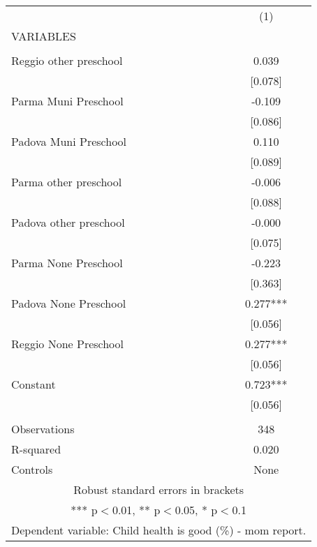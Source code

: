 \begin{tabular}{lc} \hline
 & (1) \\
VARIABLES &  \\ \hline
 &  \\
Reggio other preschool & 0.039 \\
 & [0.078] \\
Parma Muni Preschool & -0.109 \\
 & [0.086] \\
Padova Muni Preschool & 0.110 \\
 & [0.089] \\
Parma other preschool & -0.006 \\
 & [0.088] \\
Padova other preschool & -0.000 \\
 & [0.075] \\
Parma None Preschool & -0.223 \\
 & [0.363] \\
Padova None Preschool & 0.277*** \\
 & [0.056] \\
Reggio None Preschool & 0.277*** \\
 & [0.056] \\
Constant & 0.723*** \\
 & [0.056] \\
 &  \\
Observations & 348 \\
R-squared & 0.020 \\
 Controls & None \\ \hline
\multicolumn{2}{c}{ Robust standard errors in brackets} \\
\multicolumn{2}{c}{ *** p$<$0.01, ** p$<$0.05, * p$<$0.1} \\
\multicolumn{2}{c}{ Dependent variable: Child health is good (\%) - mom report.} \\
\end{tabular}
